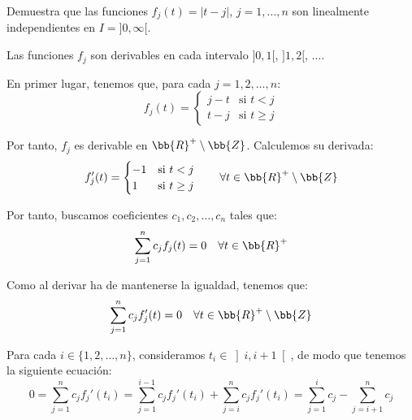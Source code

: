 \begin{ejercicio}\label{ej:4.9}
    Demuestra que las funciones $f_j(t) = |t - j|$, $j = 1, \ldots, n$ son linealmente independientes en $I = ]0, \infty[$.
    \begin{observacion}
        Las funciones $f_j$ son derivables en cada intervalo $]0, 1[$, $]1, 2[$, $\ldots$.
    \end{observacion}

    En primer lugar, tenemos que, para cada $j=1,2,\dots,n$:
    \begin{equation*}
        f_j(t)=
        \begin{cases}
            j-t & \text{si } t<j\\
            t-j & \text{si } t\geq j
        \end{cases}
    \end{equation*}

    Por tanto, $f_j$ es derivable en $\bb{R}^+\setminus \bb{Z}$. Calculemos su derivada:
    \begin{equation*}
        f_j'(t)=
        \begin{cases}
            -1 & \text{si } t<j\\
            1 & \text{si } t\geq j
        \end{cases}\qquad \forall t\in \bb{R}^+\setminus \bb{Z}
    \end{equation*}

    Por tanto, buscamos coeficientes $c_1,c_2,\dots,c_n$ tales que:
    \begin{equation*}
        \sum_{j=1}^n c_jf_j(t)=0 \quad \forall t\in \bb{R}^+
    \end{equation*}

    Como al derivar ha de mantenerse la igualdad, tenemos que:
    \begin{equation*}
        \sum_{j=1}^n c_jf_j'(t)=0 \quad \forall t\in \bb{R}^+\setminus \bb{Z}
    \end{equation*}

    Para cada $i\in \{1,2,\dots,n\}$, consideramos $t_i\in \left]i,i+1\right[$, de modo que tenemos la siguiente ecuación:
    \begin{equation*}
        0=\sum_{j=1}^n c_jf_j'(t_i)=\sum_{j=1}^{i-1} c_jf_j'(t_i)+\sum_{j=i}^n c_jf_j'(t_i)
        = \sum_{j=1}^{i} c_j-\sum_{j=i+1}^n c_j
    \end{equation*}


\end{ejercicio}
